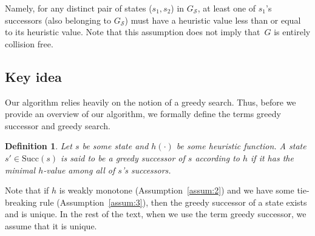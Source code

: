\documentclass[letterpaper]{article} %
\newcommand{\calS}{\ensuremath{\mathcal{S}}\xspace}
\newtheorem{definition}{Definition}
\newcommand{\update}[1]{{\color{magenta}#1}}
\begin{document}
%
%
%
%



  Namely, for any distinct pair of states ($s_1, s_2$) in $G_\calS$, at least one of $s_1$'s successors (also belonging to $G_\calS$) must have a heuristic value less than or equal to its heuristic value.
	Note that this assumption does not imply  that~$G$ is entirely collision free.

\subsection{Key idea}
\label{sec:key}
Our algorithm relies heavily on the notion of a greedy search.  Thus, before we provide an overview of our algorithm, we formally define the terms greedy successor and greedy search.

\vspace{2mm}
\begin{definition}
\label{def:greedy-suc}
	Let $s$ be some state and $h(\cdot)$ be some heuristic function.
	A state $s' \in \text{Succ}(s)$ is said to be a \emph{greedy} successor of $s$ according to $h$ if it has the minimal $h$-value among all of $s$'s successors.
\end{definition}
Note that 
if $h$ is weakly monotone 
(Assumption~\ref{assum:2}) 
and we have some tie-breaking rule
(Assumption~\ref{assum:3}), then the greedy successor of a state exists and is unique.  
In the rest of the text, when we use the term greedy successor, we assume that it is unique.
\end{document}
